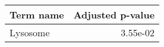 \begin{tabular}{lr}
\toprule
Term name &  Adjusted p-value \\
\midrule
 Lysosome &          3.55e-02 \\
\bottomrule
\end{tabular}
